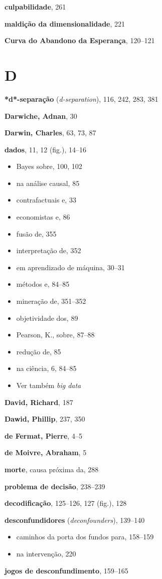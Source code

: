 \documentclass[11pt,a5paper,twoside]{book}
\begin{document}
\textbf{culpabilidade}, 261

\textbf{maldição da dimensionalidade}, 221

\textbf{Curva do Abandono da Esperança}, 120–121

\section{D}
\textbf{*d*-separação} (\textit{d-separation}), 116, 242, 283, 381

\textbf{Darwiche, Adnan}, 30

\textbf{Darwin, Charles}, 63, 73, 87

\textbf{dados}, 11, 12 (fig.), 14–16

\begin{itemize}
\item Bayes sobre, 100, 102
\item na análise causal, 85
\item contrafactuais e, 33
\item economistas e, 86
\item fusão de, 355
\item interpretação de, 352
\item em aprendizado de máquina, 30–31
\item métodos e, 84–85
\item mineração de, 351–352
\item objetividade dos, 89
\item Pearson, K., sobre, 87–88
\item redução de, 85
\item na ciência, 6, 84–85
\item Ver também \textit{big data}
\end{itemize}
\textbf{David, Richard}, 187

\textbf{Dawid, Phillip}, 237, 350

\textbf{de Fermat, Pierre}, 4–5

\textbf{de Moivre, Abraham}, 5

\textbf{morte}, causa próxima da, 288

\textbf{problema de decisão}, 238–239

\textbf{decodificação}, 125–126, 127 (fig.), 128

\textbf{desconfundidores} (\textit{deconfounders}), 139–140

\begin{itemize}
\item caminhos da porta dos fundos para, 158–159
\item na intervenção, 220
\end{itemize}
\textbf{jogos de desconfundimento}, 159–165
\end{document}
